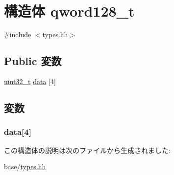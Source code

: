 \hypertarget{structqword128__t}{
\section{構造体 qword128\_\-t}
\label{structqword128__t}
}


{\ttfamily \#include $<$types.hh$>$}\subsection*{Public 変数}
\begin{DoxyCompactItemize}
\item 
\hyperlink{Type_8hh_a435d1572bf3f880d55459d9805097f62}{uint32\_\-t} \hyperlink{structqword128__t_aba3ab3dadf10b1a00fa5fc4ee3857cf6}{data} \mbox{[}4\mbox{]}
\end{DoxyCompactItemize}


\subsection{変数}
\hypertarget{structqword128__t_aba3ab3dadf10b1a00fa5fc4ee3857cf6}{
\subsubsection[{data}]{ {\bf data}\mbox{[}4\mbox{]}}}
\label{structqword128__t_aba3ab3dadf10b1a00fa5fc4ee3857cf6}


この構造体の説明は次のファイルから生成されました:\begin{DoxyCompactItemize}
\item 
base/\hyperlink{base_2types_8hh}{types.hh}\end{DoxyCompactItemize}

